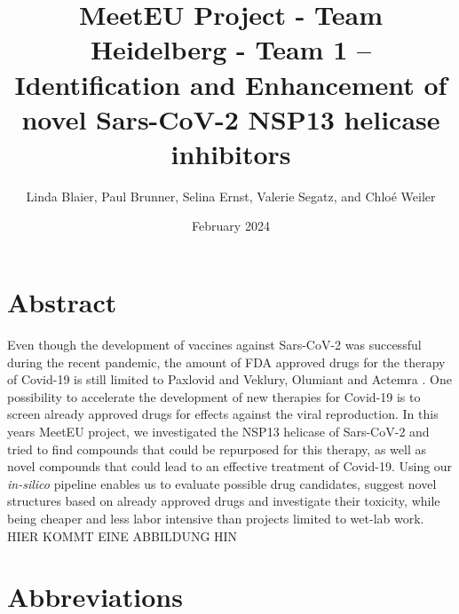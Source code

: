 \documentclass[11pt, letterpaper, titlepage]{article}
\title{MeetEU Project - Team Heidelberg - Team 1 -- \\ Identification and Enhancement of novel Sars-CoV-2 NSP13 helicase inhibitors}
\author{Linda Blaier, Paul Brunner, Selina Ernst, Valerie Segatz, and Chlo\'{e} Weiler}
\date{February 2024}
\renewcommand{\cite}{\parencite}
\begin{document}
\maketitle

\ihead{\headmark}
\cfoot{\pagemark}   %

\section{Abstract}
Even though the development of vaccines against Sars-CoV-2 was successful during the recent pandemic, the amount of FDA approved drugs for the therapy of Covid-19 is still limited to Paxlovid and Veklury, Olumiant and Actemra \cite{FDA_COVID}. One possibility to accelerate the development of new therapies for Covid-19 is to screen already approved drugs for effects against the viral reproduction. In this years MeetEU project, we investigated the NSP13 helicase of Sars-CoV-2 and tried to find compounds that could be repurposed for this therapy, as well as novel compounds that could lead to an effective treatment of Covid-19. Using our \textit{in-silico} pipeline enables us to evaluate possible drug candidates, suggest novel structures based on already approved drugs and investigate their toxicity, while being cheaper and less labor intensive than projects limited to wet-lab work. 
HIER KOMMT EINE ABBILDUNG HIN


\FloatBarrier

\newpage
{\setlength{\parskip}{0.2cm}
\section*{Abbreviations}
    \begin{acronym}[LC-MS/MS23]


        
        
        
        
        
    \end{acronym}
}
\end{document}
